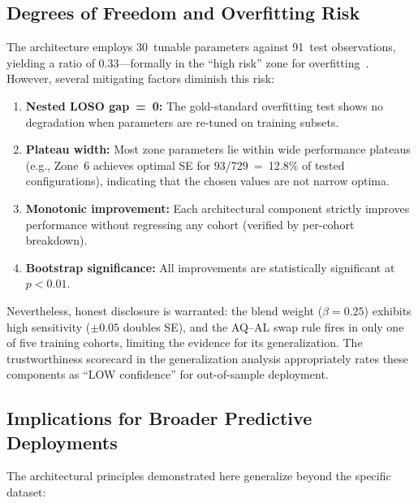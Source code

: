 \documentclass[conference]{IEEEtran}
\begin{document}
\subsection{Degrees of Freedom and Overfitting Risk}

The architecture employs 30~tunable parameters against 91~test observations, yielding a ratio of 0.33---formally in the ``high risk'' zone for overfitting~\cite{cawley2010overfitting}. However, several mitigating factors diminish this risk:

\begin{enumerate}
\item \textbf{Nested LOSO gap~=~0:} The gold-standard overfitting test shows no degradation when parameters are re-tuned on training subsets.

\item \textbf{Plateau width:} Most zone parameters lie within wide performance plateaus (e.g., Zone~6 achieves optimal SE for 93/729~=~12.8\% of tested configurations), indicating that the chosen values are not narrow optima.

\item \textbf{Monotonic improvement:} Each architectural component strictly improves performance without regressing any cohort (verified by per-cohort breakdown).

\item \textbf{Bootstrap significance:} All improvements are statistically significant at $p < 0.01$.
\end{enumerate}

Nevertheless, honest disclosure is warranted: the blend weight ($\beta = 0.25$) exhibits high sensitivity ($\pm 0.05$ doubles SE), and the AQ--AL swap rule fires in only one of five training cohorts, limiting the evidence for its generalization. The trustworthiness scorecard in the generalization analysis appropriately rates these components as ``LOW confidence'' for out-of-sample deployment.

\subsection{Implications for Broader Predictive Deployments}

The architectural principles demonstrated here generalize beyond the specific dataset:
\end{document}
